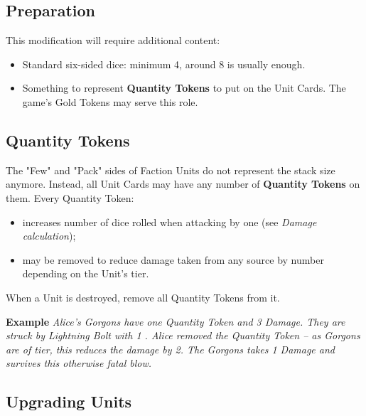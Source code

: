 
\begin{multicols*}{2}
    \subsection*{Preparation}
    
    This modification will require additional content:
    \begin{itemize}
        \item Standard six-sided dice: minimum 4, around 8 is usually enough.
        \item Something to represent \textbf{Quantity Tokens} to put on the Unit Cards. The game's Gold Tokens may serve this role.
    \end{itemize}
    
    \subsection*{Quantity Tokens}
    
    The "Few" and "Pack" sides of Faction Units do not represent the stack size anymore. Instead, all Unit Cards may have any number of \textbf{Quantity Tokens} on them. Every Quantity Token:
    \begin{itemize}
        \item increases number of dice rolled when attacking by one (see \textit{Damage calculation});
        \item may be removed to reduce damage taken from any source by number depending on the Unit's tier.
    \end{itemize} 
    
    \medskip
    
    
    When a Unit is destroyed, remove all Quantity Tokens from it.
    
    \textbf{Example} \textit{Alice's Gorgons have one Quantity Token and 3 Damage. They are struck by Lightning Bolt with 1 . Alice removed the Quantity Token -- as Gorgons are of  tier, this reduces the damage by 2. The Gorgons takes 1 Damage and survives this otherwise fatal blow.}
    
    \subsection*{Upgrading Units}
    

\end{multicols*}
